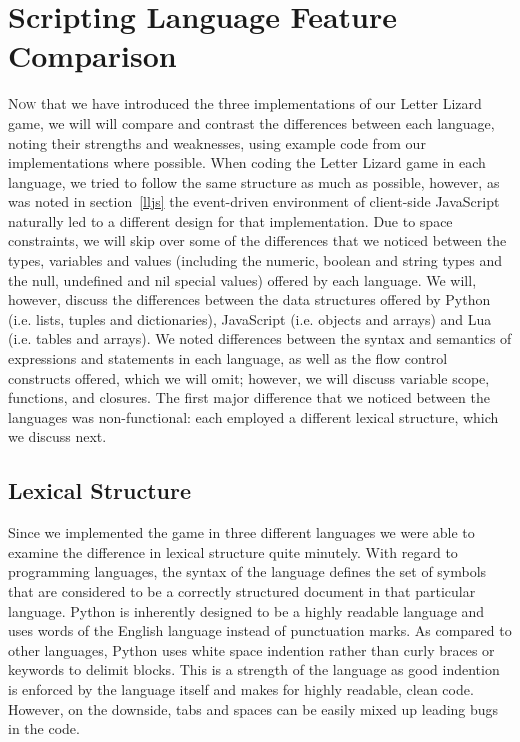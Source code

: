 \section{Scripting Language Feature Comparison}
\label{comparison}

\lettrine[nindent=0em,lines=3]{N}{ow} that we have introduced the three implementations of
our Letter Lizard game, we will will compare and contrast the differences between
each language, noting their strengths and weaknesses, using example code from our
implementations where possible. When coding the Letter Lizard game in each language,
we tried to follow the same structure as much as possible, however, as was noted in section~\ref{lljs}
the event-driven environment of client-side JavaScript naturally led to a different
design for that implementation. Due to space constraints, we will skip over some of
the differences that we noticed between the types, variables and values (including 
the numeric, boolean and string types and the null, undefined and nil special values)
offered by each language.
We will, however, discuss the differences between the data structures offered by
Python (i.e. lists, tuples and dictionaries), JavaScript (i.e. objects and arrays)
and Lua (i.e. tables and arrays). We noted differences between the syntax and semantics
of expressions and statements in each language, as well as the flow
control constructs offered, which we will omit; however, we will discuss
variable scope, functions, and closures. The first major difference that we
noticed between the languages was non-functional: each employed a different lexical
structure, which we discuss next.

\subsection{Lexical Structure}
\label{lexstruct}

Since we implemented the game in three different languages we were able to examine the difference in lexical structure quite minutely. With regard to programming languages, the syntax of the language defines the set of symbols that are considered to be a correctly structured document in that particular language. Python is inherently designed to be a highly readable language and uses words of the English language instead of punctuation marks. As compared to other languages, Python uses white space indention rather than curly braces or keywords to delimit blocks. This is a strength of the language as good indention is enforced by the language itself and makes for highly readable, clean code. However, on the downside, tabs and spaces can be easily mixed up leading bugs in the code. 


